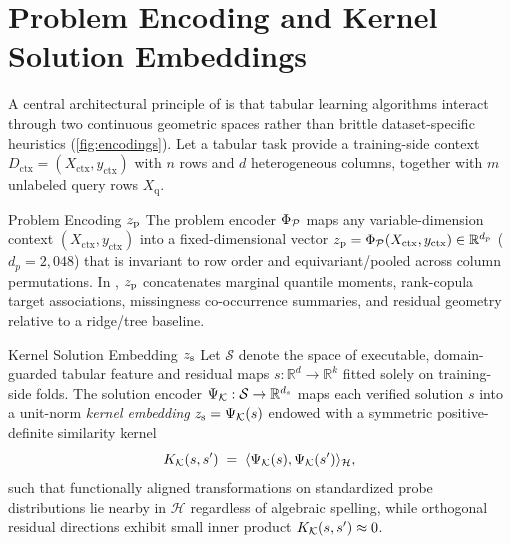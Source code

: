 \section{Problem Encoding and Kernel Solution Embeddings}
\label{sec:encodings}



A central architectural principle of \EZ{} is that tabular learning algorithms interact through two continuous geometric spaces rather than brittle dataset-specific heuristics (\cref{fig:encodings}). Let a tabular task provide a training-side context $D_{\mathrm{ctx}} = (X_{\mathrm{ctx}}, y_{\mathrm{ctx}})$ with $n$ rows and $d$ heterogeneous columns, together with $m$ unlabeled query rows $X_{\mathrm{q}}$.

\begin{definition}{Problem Encoding $z_{\mathrm{p}}$}
The problem encoder $\Phi_{\mathcal{P}}$ maps any variable-dimension context $(X_{\mathrm{ctx}}, y_{\mathrm{ctx}})$ into a fixed-dimensional vector $z_{\mathrm{p}} = \Phi_{\mathcal{P}}(X_{\mathrm{ctx}}, y_{\mathrm{ctx}}) \in \mathbb{R}^{d_p}$ ($d_p = 2{,}048$) that is invariant to row order and equivariant/pooled across column permutations. In \EZ{}, $z_{\mathrm{p}}$ concatenates marginal quantile moments, rank-copula target associations, missingness co-occurrence summaries, and residual geometry relative to a ridge/tree baseline.
\end{definition}

\begin{definition}{Kernel Solution Embedding $z_{\mathrm{s}}$}
Let $\mathcal{S}$ denote the space of executable, domain-guarded tabular feature and residual maps $s : \mathbb{R}^d \to \mathbb{R}^k$ fitted solely on training-side folds. The solution encoder $\Psi_{\mathcal{K}} : \mathcal{S} \to \mathbb{R}^{d_s}$ maps each verified solution $s$ into a unit-norm \emph{kernel embedding} $z_{\mathrm{s}} = \Psi_{\mathcal{K}}(s)$ endowed with a symmetric positive-definite similarity kernel
\begin{equation}
  K_{\mathcal{K}}(s, s') \;=\; \langle \Psi_{\mathcal{K}}(s), \Psi_{\mathcal{K}}(s') \rangle_{\mathcal{H}},
  \label{eq:kernel}
\end{equation}
such that functionally aligned transformations on standardized probe distributions lie nearby in $\mathcal{H}$ regardless of algebraic spelling, while orthogonal residual directions exhibit small inner product $K_{\mathcal{K}}(s, s') \approx 0$.
\end{definition}

